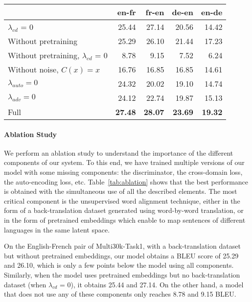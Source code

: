 \begin{table*}[t]
	\begin{center}
	\small
	\begin{tabular}[b]{lrrrr}
	\toprule
    & en-fr & fr-en & de-en & en-de \\
    \midrule
    $\lambda_{cd}$ = 0                       & 25.44 & 27.14 & 20.56 & 14.42 \\
    Without pretraining                    & 25.29 & 26.10 & 21.44 & 17.23 \\
	Without pretraining, $\lambda_{cd}$ = 0  &  8.78 &  9.15 &  7.52 &  6.24 \\
    Without noise, $C(x) = x$                          & 16.76 & 16.85 & 16.85 & 14.61 \\
	$\lambda_{auto} = 0$                   & 24.32 & 20.02 & 19.10 & 14.74 \\
    $\lambda_{adv} = 0$                    & 24.12 & 22.74 & 19.87 & 15.13 \\
    Full                                   & \textbf{27.48} & \textbf{28.07} & \textbf{23.69} & \textbf{19.32} \\
    \bottomrule
	\end{tabular}
	\caption{\textbf{Ablation study on the Multi30k-Task1 dataset}.}
	\label{tab:ablation}
	\end{center}
\end{table*}

\paragraph{Ablation Study} We perform an ablation study to understand the importance of the different components of our system. To this end, we have trained multiple versions of our model with some missing components: the discriminator, the cross-domain loss, the auto-encoding loss, etc. Table~\ref{tab:ablation} shows that the best performance is obtained with the simultaneous use of all the described elements. The most critical component is the unsupervised word alignment technique, either in the form of a back-translation dataset generated using word-by-word translation, or in the form of pretrained embeddings which enable to map sentences of different languages in the same latent space.

On the English-French pair of Multi30k-Task1, with a back-translation dataset but without pretrained embeddings, our model obtains a BLEU score of 25.29 and 26.10, which is only a few points below the model using all components. Similarly, when the model uses pretrained embeddings but no back-translation dataset (when $\lambda_{cd}$ = 0), it obtains 25.44 and 27.14. On the other hand, a model that does not use any of these components only reaches 8.78 and 9.15 BLEU. 

